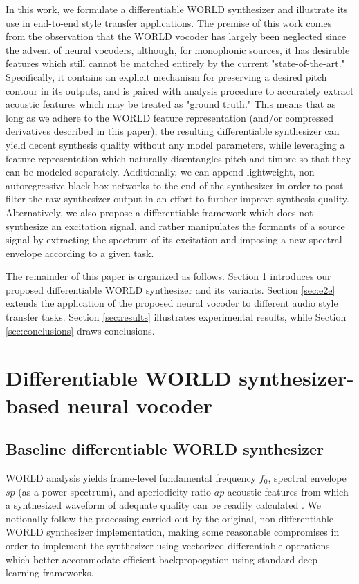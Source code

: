 \documentclass{article}
\begin{document}
\begin{sloppy}
In this work, we formulate a differentiable WORLD synthesizer and illustrate its use in end-to-end style transfer applications.  The premise of this work comes from the observation that the WORLD vocoder has largely been neglected since the advent of neural vocoders, although, for monophonic sources, it has desirable features which still cannot be matched entirely by the current "state-of-the-art."  Specifically, it contains an explicit mechanism for preserving a desired pitch contour in its outputs, and is paired with analysis procedure to accurately extract acoustic features which may be treated as "ground truth."  This means that as long as we adhere to the WORLD feature representation (and/or compressed derivatives described in this paper), the resulting differentiable synthesizer can yield decent synthesis quality without any model parameters, while leveraging a feature representation which naturally disentangles pitch and timbre so that they can be modeled separately.  Additionally, we can append lightweight, non-autoregressive black-box networks to the end of the synthesizer in order to post-filter the raw synthesizer output in an effort to further improve synthesis quality.  Alternatively, we also propose a differentiable framework which does not synthesize an excitation signal, and rather manipulates the formants of a source signal by extracting the spectrum of its excitation and imposing a new spectral envelope according to a given task.

The remainder of this paper is organized as follows.  Section \ref{sec:vocoder} introduces our proposed differentiable WORLD synthesizer and its variants.  Section \ref{sec:e2e} extends the application of the proposed neural vocoder to different audio style transfer tasks.  Section \ref{sec:results} illustrates experimental results, while Section \ref{sec:conclusions} draws conclusions.

\section{Differentiable WORLD synthesizer-based neural vocoder}
\label{sec:vocoder}

\subsection{Baseline differentiable WORLD synthesizer}
\label{ssec:baseline}
WORLD analysis yields frame-level fundamental frequency $f_0$, spectral envelope $sp$ (as a power spectrum), and aperiodicity ratio $ap$ acoustic features from which a synthesized waveform of adequate quality can be readily calculated \cite{WORLD}.  We notionally follow the processing carried out by the original, non-differentiable WORLD synthesizer implementation, making some reasonable compromises in order to implement the synthesizer using vectorized differentiable operations which better accommodate efficient backpropogation using standard deep learning frameworks.


\end{sloppy}
\end{document}
